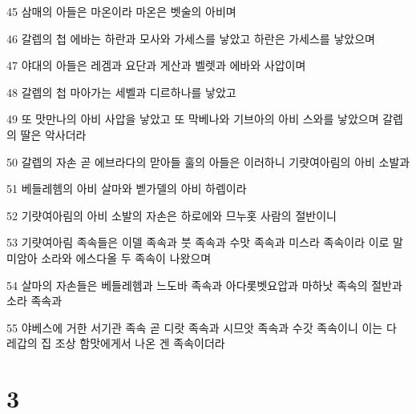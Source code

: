 \par 45 삼매의 아들은 마온이라 마온은 벳술의 아비며
\par 46 갈렙의 첩 에바는 하란과 모사와 가세스를 낳았고 하란은 가세스를 낳았으며
\par 47 야대의 아들은 레겜과 요단과 게산과 벨렛과 에바와 사압이며
\par 48 갈렙의 첩 마아가는 세벨과 디르하나를 낳았고
\par 49 또 맛만나의 아비 사압을 낳았고 또 막베나와 기브아의 아비 스와를 낳았으며 갈렙의 딸은 악사더라
\par 50 갈렙의 자손 곧 에브라다의 맏아들 훌의 아들은 이러하니 기럇여아림의 아비 소발과
\par 51 베들레헴의 아비 살마와 벧가델의 아비 하렙이라
\par 52 기럇여아림의 아비 소발의 자손은 하로에와 므누홋 사람의 절반이니
\par 53 기럇여아림 족속들은 이델 족속과 붓 족속과 수맛 족속과 미스라 족속이라 이로 말미암아 소라와 에스다올 두 족속이 나왔으며
\par 54 살마의 자손들은 베들레헴과 느도바 족속과 아다롯벳요압과 마하낫 족속의 절반과 소라 족속과
\par 55 야베스에 거한 서기관 족속 곧 디랏 족속과 시므앗 족속과 수갓 족속이니 이는 다 레갑의 집 조상 함맛에게서 나온 겐 족속이더라

\chapter{3}

